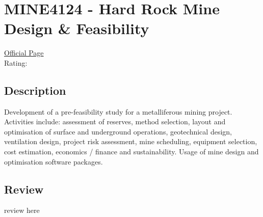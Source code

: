 \hypertarget{MINE4124}{\section{MINE4124 - Hard Rock Mine Design \& Feasibility}}

\large
\textcolor{turbo_purple}{\href{https://my.uq.edu.au/programs-courses/course.html?course_code=MINE4124}{Official Page}} \\
Rating: \cstar\cstar\cstar\cstar\ostar

\normalsize
\subsection*{Description}
Development of a pre-feasibility study for a metalliferous mining project.
Activities include: assessment of reserves, method selection, layout and optimisation of surface and underground operations, geotechnical design, ventilation design, project risk assessment, mine scheduling, equipment selection, cost estimation, economics / finance and sustainability.
Usage of mine design and optimisation software packages.

\subsection*{Review}
review here
